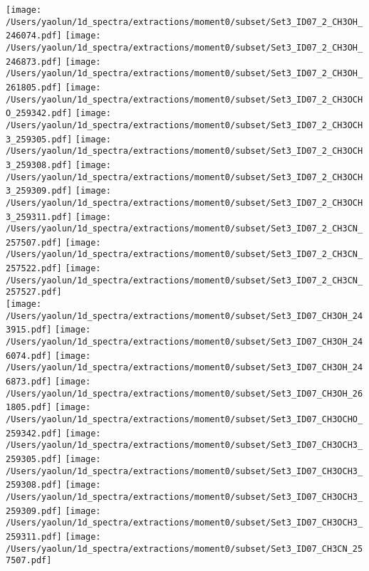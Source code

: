 \begin{figure*}[htbp!]
  \texttt{[image: /Users/yaolun/1d\_spectra/extractions/moment0/subset/Set3\_ID07\_2\_CH3OH\_246074.pdf]}
  \texttt{[image: /Users/yaolun/1d\_spectra/extractions/moment0/subset/Set3\_ID07\_2\_CH3OH\_246873.pdf]}
  \texttt{[image: /Users/yaolun/1d\_spectra/extractions/moment0/subset/Set3\_ID07\_2\_CH3OH\_261805.pdf]}
  \texttt{[image: /Users/yaolun/1d\_spectra/extractions/moment0/subset/Set3\_ID07\_2\_CH3OCHO\_259342.pdf]}
  \texttt{[image: /Users/yaolun/1d\_spectra/extractions/moment0/subset/Set3\_ID07\_2\_CH3OCH3\_259305.pdf]}
  \texttt{[image: /Users/yaolun/1d\_spectra/extractions/moment0/subset/Set3\_ID07\_2\_CH3OCH3\_259308.pdf]}
  \texttt{[image: /Users/yaolun/1d\_spectra/extractions/moment0/subset/Set3\_ID07\_2\_CH3OCH3\_259309.pdf]}
  \texttt{[image: /Users/yaolun/1d\_spectra/extractions/moment0/subset/Set3\_ID07\_2\_CH3OCH3\_259311.pdf]}
  \texttt{[image: /Users/yaolun/1d\_spectra/extractions/moment0/subset/Set3\_ID07\_2\_CH3CN\_257507.pdf]}
  \texttt{[image: /Users/yaolun/1d\_spectra/extractions/moment0/subset/Set3\_ID07\_2\_CH3CN\_257522.pdf]}
  \texttt{[image: /Users/yaolun/1d\_spectra/extractions/moment0/subset/Set3\_ID07\_2\_CH3CN\_257527.pdf]}
  \\
  \texttt{[image: /Users/yaolun/1d\_spectra/extractions/moment0/subset/Set3\_ID07\_CH3OH\_243915.pdf]}
  \texttt{[image: /Users/yaolun/1d\_spectra/extractions/moment0/subset/Set3\_ID07\_CH3OH\_246074.pdf]}
  \texttt{[image: /Users/yaolun/1d\_spectra/extractions/moment0/subset/Set3\_ID07\_CH3OH\_246873.pdf]}
  \texttt{[image: /Users/yaolun/1d\_spectra/extractions/moment0/subset/Set3\_ID07\_CH3OH\_261805.pdf]}
  \texttt{[image: /Users/yaolun/1d\_spectra/extractions/moment0/subset/Set3\_ID07\_CH3OCHO\_259342.pdf]}
  \texttt{[image: /Users/yaolun/1d\_spectra/extractions/moment0/subset/Set3\_ID07\_CH3OCH3\_259305.pdf]}
  \texttt{[image: /Users/yaolun/1d\_spectra/extractions/moment0/subset/Set3\_ID07\_CH3OCH3\_259308.pdf]}
  \texttt{[image: /Users/yaolun/1d\_spectra/extractions/moment0/subset/Set3\_ID07\_CH3OCH3\_259309.pdf]}
  \texttt{[image: /Users/yaolun/1d\_spectra/extractions/moment0/subset/Set3\_ID07\_CH3OCH3\_259311.pdf]}
  \texttt{[image: /Users/yaolun/1d\_spectra/extractions/moment0/subset/Set3\_ID07\_CH3CN\_257507.pdf]}

\end{figure*}
